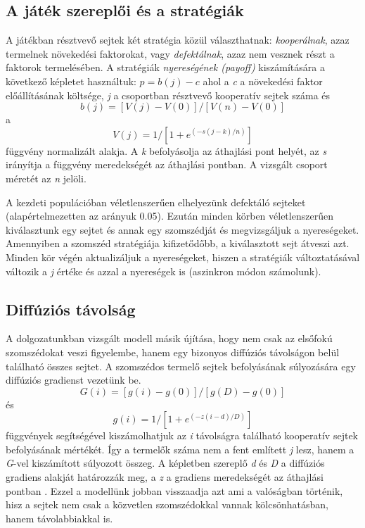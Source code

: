 \subsection{A játék szereplői és a stratégiák}
A játékban résztvevő sejtek két stratégia közül választhatnak: \textit{kooperálnak}, azaz termelnek növekedési faktorokat, vagy \textit{defektálnak}, azaz nem vesznek részt a faktorok termelésében. A stratégiák \textit{nyereségének (payoff)} kiszámítására a következő képletet használtuk: \(p = b(j) - c\) ahol a \textit{c} a növekedési faktor előállításának költsége, \textit{j} a csoportban résztvevő kooperatív sejtek száma és
\begin{equation}
b(j) = [V(j) - V(0)]/[V(n) - V(0)]
\end{equation}
a
\begin{equation} \label{eq:payoffGradient}
V(j) = 1/[1 + e^{(-s(j-k)/n)}]
\end{equation}
függvény normalizált alakja. A \textit{k} befolyásolja az áthajlási pont helyét, az \textit{s} irányítja a függvény meredekségét az áthajlási pontban. A vizsgált csoport méretét az \textit{n} jelöli. 

A kezdeti populációban véletlenszerűen elhelyezünk defektáló sejteket (alapértelmezetten az arányuk 0.05). Ezután minden körben véletlenszerűen kiválasztunk egy sejtet és annak egy szomszédját és megvizsgáljuk a nyereségeket. Amennyiben a szomszéd stratégiája kifizetődőbb, a kiválasztott sejt átveszi azt. Minden kör végén aktualizáljuk a nyereségeket, hiszen a stratégiák változtatásával változik a \textit{j} értéke és azzal a nyereségek is (aszinkron módon számolunk). 

\subsection{Diffúziós távolság}
A dolgozatunkban vizsgált modell másik újítása, hogy nem csak az elsőfokú szomszédokat veszi figyelembe, hanem egy bizonyos diffúziós távolságon belül található összes sejtet. A szomszédos termelő sejtek befolyásának súlyozására egy diffúziós gradienst vezetünk be. 
\begin{equation}
G(i) = [g(i) - g(0)]/[g(D) - g(0)] 
\end{equation}
és
\begin{equation} \label{eq:diffGradient}
g(i) = 1/[1 + e^{(-z(i-d)/D)}]
\end{equation}
függvények segítségével kiszámolhatjuk az \textit{i} távolságra található kooperatív sejtek befolyásának mértékét. Így a termelők száma nem a fent említett \textit{j} lesz, hanem a \textit{G}-vel kiszámított súlyozott összeg. A képletben szereplő \textit{d} és \textit{D} a diffúziós gradiens alakját határozzák meg, a \textit{z} a gradiens meredekségét az áthajlási pontban \cite{archetti2016cooperation}. Ezzel a modellünk jobban visszaadja azt ami a valóságban történik, hisz a sejtek nem csak a közvetlen szomszédokkal vannak kölcsönhatásban, hanem távolabbiakkal is.

